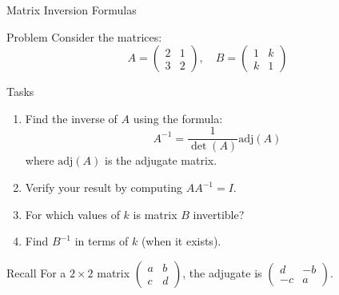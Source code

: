 \documentclass[aspectratio=1610]{beamer}
\begin{document}
\begin{frame}{Matrix Inversion Formulas}

\begin{block}{Problem}
Consider the matrices:
$$A = \begin{pmatrix} 2 & 1 \\ 3 & 2 \end{pmatrix}, \quad B = \begin{pmatrix} 1 & k \\ k & 1 \end{pmatrix}$$
\end{block}

\begin{block}{Tasks}
\begin{enumerate}
\item Find the inverse of $A$ using the formula:
$$A^{-1} = \frac{1}{\det(A)} \text{adj}(A)$$
where $\text{adj}(A)$ is the adjugate matrix.

\item Verify your result by computing $AA^{-1} = I$.

\item For which values of $k$ is matrix $B$ invertible?

\item Find $B^{-1}$ in terms of $k$ (when it exists).
\end{enumerate}
\end{block}

\begin{block}{Recall}
For a $2 \times 2$ matrix $\begin{pmatrix} a & b \\ c & d \end{pmatrix}$, the adjugate is $\begin{pmatrix} d & -b \\ -c & a \end{pmatrix}$.
\end{block}

\end{frame}
\end{document}
